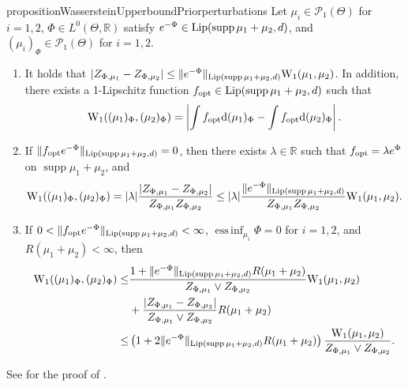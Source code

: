 \documentclass[a4paper]{scrartcl}
\theoremstyle{definition}
\numberwithin{equation}{section}
\newcommand{\R}{\mathbb{R}}
\newcommand{\rd}{\mathrm{d}}
\DeclareMathOperator{\supp}{supp}
\DeclareMathOperator*{\essinf}{ess\,inf}
\newcommand{\abs}[1]{\vert #1\vert}
\newcommand{\Abs}[1]{\left\vert#1\right\vert}
\newcommand{\norm}[1]{\Vert #1 \Vert}
\newcommand{\Lip}[0]{\textup{Lip}}
\newcommand{\Was}[0]{\textup{W}}
\newcommand{\opt}[0]{\textup{opt}}
\begin{document}
\begin{restatable}{proposition}{WassersteinUpperboundPriorperturbations}
\label{proposition_W1_upper_bound_prior_perturbations}
Let $\mu_i\in\mathcal{P}_1(\Theta)$ for $i=1,2$, $\Phi \in L^0(\Theta,\R)$ satisfy $e^{-\Phi}\in \Lip(\supp{\mu_1+\mu_2},d)$, and $(\mu_i)_\Phi\in\mathcal{P}_1(\Theta)$ for $i=1,2$.
\begin{enumerate}
\item \label{proposition_W1_upper_bound_prior_perturbations_normalisation_constant}
It holds that $\abs{Z_{\Phi,\mu_1}-Z_{\Phi,\mu_2}}\leq \norm{e^{-\Phi}}_{\Lip(\supp{\mu_1+\mu_2},d)} \Was_1(\mu_1,\mu_2)$. 
In addition, there exists a 1-Lipschitz function $f_\opt\in\Lip(\supp{\mu_1+\mu_2},d)$ such that 
\begin{equation*}
 \Was_1((\mu_1)_\Phi,(\mu_2)_\Phi)=\Abs{\int f_\opt \rd (\mu_1)_\Phi-\int f_\opt \rd (\mu_2)_\Phi}.
\end{equation*}

\item \label{proposition_W1_upper_bound_prior_perturbations_zero_Lipschitz_constant_case}
If $\norm{f_\opt e^{-\Phi}}_{\Lip(\supp{\mu_1+\mu_2},d)}=0$, then there exists $\lambda\in\R$ such that $f_\opt =\lambda e^{\Phi}$ on $\supp{\mu_1+\mu_2}$, and 
\begin{equation*}
 \Was_1((\mu_1)_\Phi,(\mu_2)_\Phi)=\abs{\lambda}\frac{\abs{Z_{\Phi,\mu_1}-Z_{\Phi,\mu_2}}}{Z_{\Phi,\mu_1}Z_{\Phi,\mu_2}}\leq \abs{\lambda}\frac{\norm{e^{-\Phi}}_{\Lip(\supp{\mu_1+\mu_2},d)}}{Z_{\Phi,\mu_1}Z_{\Phi,\mu_2}} \Was_1(\mu_1,\mu_2).
\end{equation*}
\item \label{proposition_W1_upper_bound_prior_perturbations_nonzero_Lipschitz_constant_case}
If $0<\norm{f_\opt e^{-\Phi}}_{\Lip(\supp{\mu_1+\mu_2},d)}<\infty$, $\essinf_{\mu_i}\Phi=0$ for $i=1,2$, and $R(\mu_1+\mu_2)<\infty$, then 
 \begin{align*}
  \Was_1((\mu_1)_\Phi,(\mu_2)_\Phi) \leq &
   \frac{1+\norm{e^{-\Phi}}_{\Lip(\supp{\mu_1+\mu_2},d)} R(\mu_1+\mu_2)}{Z_{\Phi,\mu_1}\vee Z_{\Phi,\mu_2}} \Was_1(\mu_1,\mu_2)
   \\
   &+\frac{\abs{Z_{\Phi,\mu_1}-Z_{\Phi,\mu_2}}}{Z_{\Phi,\mu_1}\vee Z_{\Phi,\mu_2}} R(\mu_1+\mu_2)
 \\
 \leq &\left(1+2\norm{e^{-\Phi}}_{\Lip(\supp{\mu_1+\mu_2},d)} R(\mu_1+\mu_2)\right) \frac{\Was_1(\mu_1,\mu_2)}{Z_{\Phi,\mu_1}\vee Z_{\Phi,\mu_2}}.
  \end{align*}
\end{enumerate}
  \end{restatable}
  See  for the proof of .
  
\end{document}
